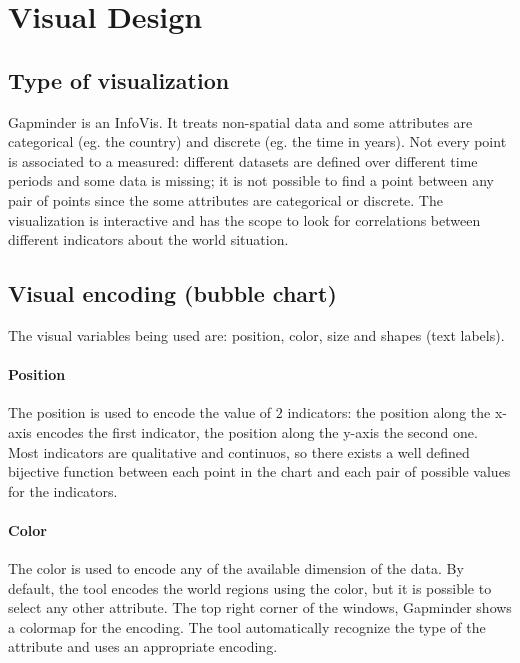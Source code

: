 \section{Visual Design}
\label{sec:visual_design}

\subsection{Type of visualization}
Gapminder is an InfoVis.
It treats non-spatial data and some attributes are categorical (eg. the country) and discrete (eg. the time in years).
Not every point is associated to a measured: different datasets are defined over different time periods and some data is missing; it is not possible to find a point between any pair of points since the some attributes are categorical or discrete.
The visualization is interactive and has the scope to look for correlations between different indicators about the world situation.

\subsection{Visual encoding (bubble chart)}
The visual variables being used are: position, color, size and shapes (text labels).

\paragraph{Position}
The position is used to encode the value of $2$ indicators: the position along the x-axis encodes the first indicator, the position along the y-axis the second one.
Most indicators are qualitative and continuos, so there exists a well defined bijective function between each point in the chart and each pair of possible values for the indicators.


\paragraph{Color}
The color is used to encode any of the available dimension of the data.
By default, the tool encodes the world regions using the color, but it is possible to select any other attribute.
The top right corner of the windows, Gapminder shows a colormap for the encoding.
The tool automatically recognize the type of the attribute and uses an appropriate encoding.

